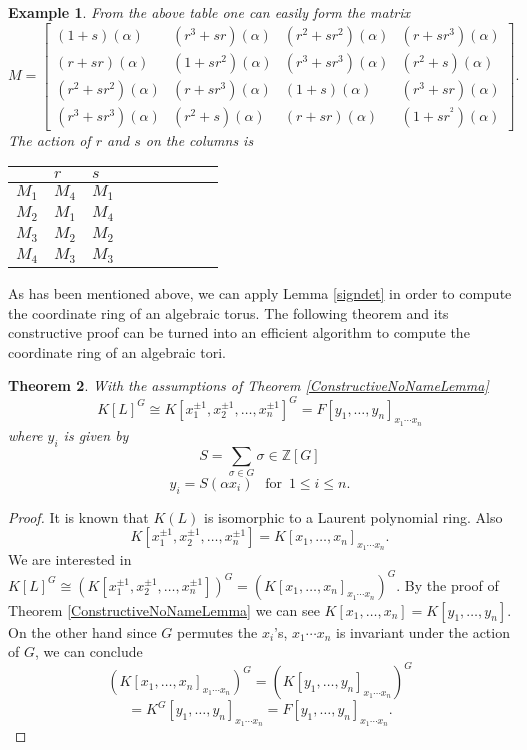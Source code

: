 \documentclass[12pt]{article}
\theoremstyle{plain}
\newtheorem{theorem}{Theorem}
\newtheorem{example}[theorem]{Example}
\newcommand{\Z}{\ensuremath{\mathbb{Z}}}
\begin{document}
\begin{example}
From the above table one can easily form the matrix 
$$
M= \begin{bmatrix}
(1+s)(\alpha) & (r^3+sr)(\alpha) & (r^2+sr^2)(\alpha) & (r+sr^3)(\alpha)\\
(r+sr)(\alpha) & (1+sr^2)(\alpha) & (r^3+sr^3)(\alpha) & (r^2+s)(\alpha)\\
(r^2+sr^2)(\alpha) & (r+sr^3)(\alpha) & (1+s)(\alpha) & (r^3+sr)(\alpha)\\
(r^3+sr^3)(\alpha) & (r^2+s)(\alpha) & (r+sr)(\alpha) & (1+sr^^2)(\alpha)
\end{bmatrix}.
$$
The action of $r$ and $s$ on the columns is
\begin{table}[H]
\centering
\begin{tabular}{l|llllllll} 
 & $r$ & $s$ \\
 \hline
 $M_1$  & $M_4$ & $M_1$ \\
$M_2$ & $M_1$ & $M_4$ \\
$M_3$ & $M_2$ & $M_2$ \\
$M_4$ & $M_3$ & $M_3$ \\
\end{tabular}
\end{table}

\end{example} 

As has been mentioned above, we can apply Lemma \ref{signdet} in order to compute the coordinate ring of an algebraic torus. The following theorem and its constructive proof can be turned into an efficient algorithm to compute the coordinate ring of an algebraic tori.
\begin{theorem}
With the assumptions of Theorem \ref{ConstructiveNoNameLemma} $$K[L]^G \cong K[x^{\pm 1}_1, x^{\pm 1}_2, \ldots , x^{\pm 1}_n]^G = F[y_1, \ldots , y_n]_{x_1\cdots x_n}$$ where $ y_i$ is given by $$S = \sum_{\sigma \in G} \sigma \in \Z[G]$$
$$y_i = S(\alpha x_i)  \,\,\,\,\, \text{for} \,\,\, 1\leq i \leq n.$$
\end{theorem}
\begin{proof}
It is known that $K(L)$ is isomorphic to a Laurent polynomial ring. Also $$K[x^{\pm 1}_1, x^{\pm 1}_2, \ldots , x^{\pm 1}_n] = K[x_1, \ldots , x_n]_{x_1\cdots x_n}.$$ We are interested in $K[L]^G \cong \left( K[x^{\pm 1}_1, x^{\pm 1}_2, \ldots , x^{\pm 1}_n] \right)^G = \left(K[x_1, \ldots , x_n]_{x_1\cdots x_n} \right) ^G.$ By the proof of Theorem \ref{ConstructiveNoNameLemma} we can see $K[x_1, \ldots , x_n] = K[y_1, \ldots , y_n]$. 
On the other hand since $G$ permutes the $x_i$'s, $x_1\cdots x_n$ is invariant under the action of $G$, we can conclude $$\left( K[x_1, \ldots , x_n]_{x_1\cdots x_n}\right)^G =  \left( K[y_1, \ldots , y_n]_{x_1\cdots x_n} \right)^G$$$$ = K^G [y_1, \ldots , y_n]_{x_1\cdots x_n} =  F[y_1, \ldots , y_n]_{x_1\cdots x_n}.$$ 
\end{proof}
\end{document}

